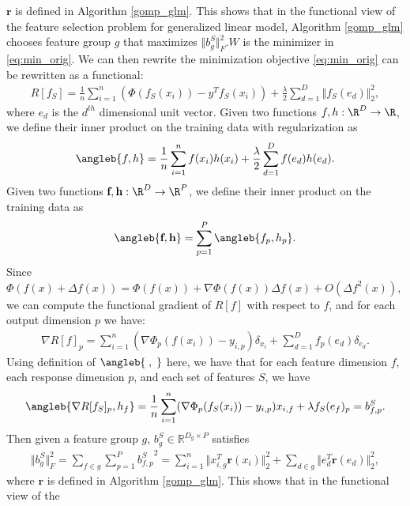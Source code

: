 $\textbf{r}$ is defined in Algorithm \ref{gomp_glm}. This shows that in the functional view of the 
feature selection problem for generalized linear model, Algorithm \ref{gomp_glm} chooses
feature group $g$ that maximizes $\Vert b_{g}^S \Vert _F^2$.$W$ is the minimizer in \ref{eq:min_orig}. 
We can then rewrite the minimization objective \ref{eq:min_orig}
can be rewritten as a functional:
\begin{align}
  R[f_S] = \frac{1}{n} \sum _{i=1}^n (\Phi(f_S(x_i)) - y^Tf_S(x_i)) 
    + \frac{\lambda}{2} \sum _{d = 1}^D \Vert f_S(e_d) \Vert _2^2,
  \label{min_func}
\end{align}
where $e_d$ is the $d^{th}$ dimensional unit vector.
Given two functions $f, h : \R^D \rightarrow \R$, we define their inner product 
on the training data with regularization as 
\begin{align}
\angleb{f, h} = \frac{1}{n} 
  \sum _{i=1}^n f(x_i)h(x_i) + \frac{\lambda}{2} \sum _{d=1}^D f(e_d)h(e_d).
\end{align}
Given two functions $\textbf{f}, \textbf{h}: \R^D \rightarrow \R^P$, 
we define their inner product on the training data as 
\begin{align}
  \angleb{\textbf{f}, \textbf{h}} = \sum _{p=1}^P \angleb{f_p, h_p}.
\end{align}
Since $\Phi(f(x) + \Delta f(x)) = \Phi(f(x)) + \nabla\Phi(f(x))\Delta f(x) + 
O(\Delta f^2(x))$,
we can compute the functional gradient of $R[f]$
with respect to $f$, and for each output dimension $p$ we have:
\begin{align}
  \nabla R[f]_p = \sum_{i=1}^n (\nabla\Phi_p(f(x_i)) - y_{i,p})\delta_{x_i} 
    + \sum _{d=1}^D f_p(e_d)\delta_{e_d}.
\end{align}
Using definition of $\angleb{\;,\;}$ here, we have that
for each feature dimension $f$, each response dimension $p$, 
  and each set of features $S$, we have  
\begin{align}
  \angleb{\nabla R[f_S]_p , h_f} = 
    \frac{1}{n}\sum_{i=1}^n (\nabla\Phi_p(f_S(x_i)) - y_{i,p})x_{i,f}
    + \lambda f_S(e_f)_p = b_{f,p}^S. 
\end{align}
Then given a feature group $g$, $b_{g}^S \in \mathbb{R}^{D_g \times P}$ satisfies 
\begin{align}
  \Vert b_{g}^S \Vert _F^2 = \sum _{f \in g} \sum _{p=1}^P {b_{f,p}^S}^2 = 
    \sum _{i=1}^n \Vert x_{i,g}^T\textbf{r}(x_{i}) \Vert _2^2  + \sum _{d \in g} \Vert e_d^T\textbf{r}(e_d) \Vert _2^2,
\end{align} where
$\textbf{r}$ is defined in Algorithm \ref{gomp_glm}. This shows that in the functional view of the 
